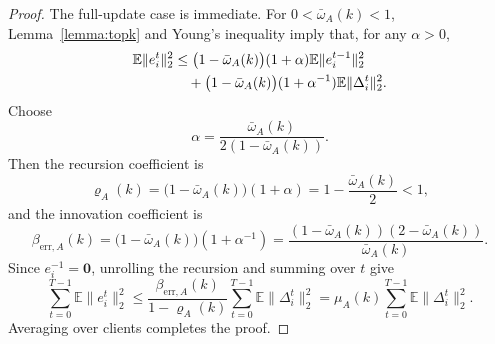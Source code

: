 \documentclass[journal]{IEEEtran}
\begin{document}
\begin{proof}
    The full-update case is immediate. For $0<\bar{\omega}_A(k)<1$, Lemma~\ref{lemma:topk} and Young's inequality imply that, for any $\alpha>0$,
    \begin{align}
        \mathbb{E}\|e_i^t\|_2^2
        &\le
        \big(1-\bar{\omega}_A(k)\big)(1+\alpha)\mathbb{E}\|e_i^{t-1}\|_2^2
        \notag\\
        &\quad+
        \big(1-\bar{\omega}_A(k)\big)(1+\alpha^{-1})\mathbb{E}\|\Delta_i^t\|_2^2.
    \end{align}
    Choose
    \begin{equation}
        \alpha=\frac{\bar{\omega}_A(k)}{2(1-\bar{\omega}_A(k))}.
    \end{equation}
    Then the recursion coefficient is
    \begin{equation}
        \varrho_A(k)
        =\big(1-\bar{\omega}_A(k)\big)(1+\alpha)
        =1-\frac{\bar{\omega}_A(k)}{2}<1,
    \end{equation}
    and the innovation coefficient is
    \begin{equation}
        \beta_{\mathrm{err},A}(k)
        =\big(1-\bar{\omega}_A(k)\big)(1+\alpha^{-1})
        =\frac{(1-\bar{\omega}_A(k))(2-\bar{\omega}_A(k))}{\bar{\omega}_A(k)}.
    \end{equation}
    Since $e_i^{-1}=\mathbf{0}$, unrolling the recursion and summing over $t$ give
    \begin{equation}
        \sum_{t=0}^{T-1}\mathbb{E}\|e_i^t\|_2^2
        \le
        \frac{\beta_{\mathrm{err},A}(k)}{1-\varrho_A(k)}
        \sum_{t=0}^{T-1}\mathbb{E}\|\Delta_i^t\|_2^2
        =\mu_A(k)\sum_{t=0}^{T-1}\mathbb{E}\|\Delta_i^t\|_2^2.
    \end{equation}
    Averaging over clients completes the proof.
\end{proof}
\end{document}
